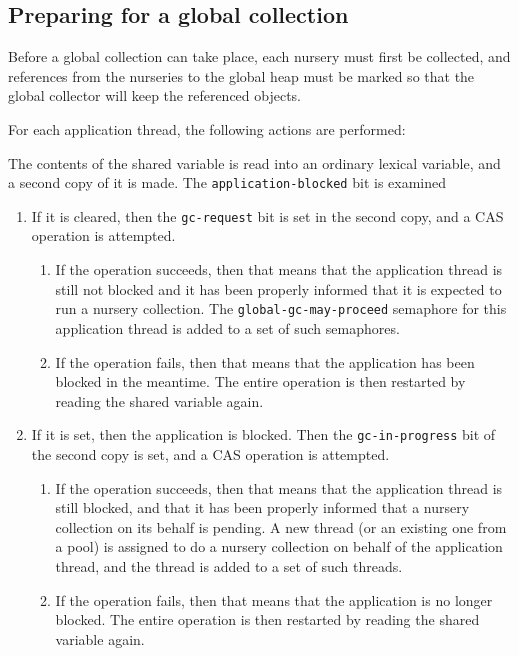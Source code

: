 \subsection{Preparing for a global collection}

Before a global collection can take place, each nursery must first be
collected, and references from the nurseries to the global heap must
be marked so that the global collector will keep the referenced
objects.

For each application thread, the following actions are performed:

The contents of the shared variable is read into an ordinary lexical
variable, and a second copy of it is made.  The
\texttt{application-blocked} bit is examined

\begin{enumerate}
\item If it is cleared, then the \texttt{gc-request} bit is set in the
  second copy, and a CAS operation is attempted.
  \begin{enumerate}
  \item If the operation succeeds, then that means that the
    application thread is still not blocked and it has been properly
    informed that it is expected to run a nursery collection.  The
    \texttt{global-gc-may-proceed} semaphore for this application
    thread is added to a set of such semaphores.
  \item If the operation fails, then that means that the application
    has been blocked in the meantime.  The entire operation is then
    restarted by reading the shared variable again.
  \end{enumerate}
\item If it is set, then the application is blocked.  Then the
  \texttt{gc-in-progress} bit of the second copy is set, and a CAS
  operation is attempted.
  \begin{enumerate}
  \item If the operation succeeds, then that means that the
    application thread is still blocked, and that it has been properly
    informed that a nursery collection on its behalf is pending.  A
    new thread (or an existing one from a pool) is assigned to do a
    nursery collection on behalf of the application thread, and the
    thread is added to a set of such threads.
    \item If the operation fails, then that means that the application
      is no longer blocked.  The entire operation is then restarted by
      reading the shared variable again.
  \end{enumerate}
\end{enumerate}

